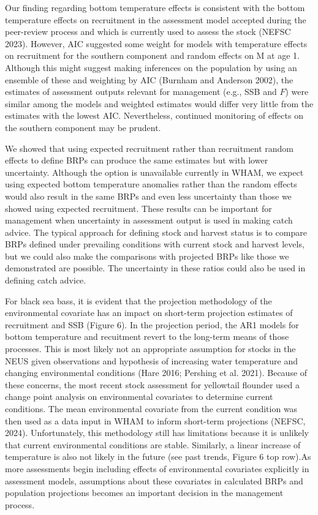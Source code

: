 \documentclass[
]{article}
\begin{document}
Our finding regarding bottom temperature effects is consistent with the
bottom temperature effects on recruitment in the assessment model
accepted during the peer-review process and which is currently used to
assess the stock (NEFSC 2023). However, AIC suggested some weight for
models with temperature effects on recruitment for the southern
component and random effects on M at age 1. Although this might suggest
making inferences on the population by using an ensemble of these and
weighting by AIC (Burnham and Anderson 2002), the estimates of
assessment outputs relevant for management (e.g., SSB and \(F\)) were
similar among the models and weighted estimates would differ very little
from the estimates with the lowest AIC. Nevertheless, continued
monitoring of effects on the southern component may be prudent.

We showed that using expected recruitment rather than recruitment random
effects to define BRPs can produce the same estimates but with lower
uncertainty. Although the option is unavailable currently in WHAM, we
expect using expected bottom temperature anomalies rather than the
random effects would also result in the same BRPs and even less
uncertainty than those we showed using expected recruitment. These
results can be important for management when uncertainty in assessment
output is used in making catch advice. The typical approach for defining
stock and harvest status is to compare BRPs defined under prevailing
conditions with current stock and harvest levels, but we could also make
the comparisons with projected BRPs like those we demonstrated are
possible. The uncertainty in these ratios could also be used in defining
catch advice.

For black sea bass, it is evident that the projection methodology of the
environmental covariate has an impact on short-term projection estimates
of recruitment and SSB (Figure 6). In the projection period, the AR1
models for bottom temperature and recuitment revert to the long-term
means of those processes. This is most likely not an appropriate
assumption for stocks in the NEUS given observations and hypothesis of
increasing water temperature and changing environmental conditions (Hare
2016; Pershing et al. 2021). Because of these concerns, the most recent
stock assessment for yellowtail flounder used a change point analysis on
environmental covariates to determine current conditions. The mean
environmental covariate from the current condition was then used as a
data input in WHAM to inform short-term projections (NEFSC, 2024).
Unfortunately, this methodology still has limitations because it is
unlikely that current environmental conditions are stable. Similarly, a
linear increase of temperature is also not likely in the future (see
past trends, Figure 6 top row).As more assessments begin including
effects of environmental covariates explicitly in assessment models,
assumptions about these covariates in calculated BRPs and population
projections becomes an important decision in the management process.
\end{document}
